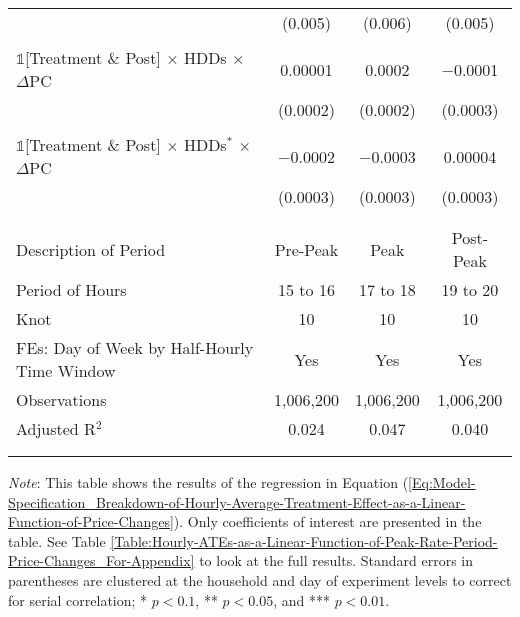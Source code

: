 {\begin{table}[t!]
\begin{adjustbox}{scale = 0.8}
\begin{threeparttable}
\begin{tabular}{@{\extracolsep{40pt}}lccc}
                    & (0.005) & (0.006) & (0.005) \\
                    & & & \\
                    $\mathbb{1}$[Treatment \& Post] $\times$ HDDs $\times$ $\Delta$PC & 0.00001 & 0.0002 & $-$0.0001 \\
                    & (0.0002) & (0.0002) & (0.0003) \\
                    & & & \\
                    $\mathbb{1}$[Treatment \& Post] $\times$ HDDs$^{*}$ $\times$ $\Delta$PC & $-$0.0002 & $-$0.0003 & 0.00004 \\
                    & (0.0003) & (0.0003) & (0.0003) \\
                    & & & \\
                    \hline
                    \\[-2.0ex]
                    Description of Period & Pre-Peak & Peak & Post-Peak \\
                    Period of Hours & 15 to 16 & 17 to 18 & 19 to 20 \\
                    Knot & 10 & 10 & 10 \\
                    FEs: Day of Week by Half-Hourly Time Window & Yes & Yes & Yes \\
                    Observations & 1,006,200 & 1,006,200 & 1,006,200 \\
                    Adjusted R$^{2}$ & 0.024 & 0.047 & 0.040 \\
                    \\[-2.0ex]
                    \hline \hline
                    \\[-4.5ex]
                \end{tabular}
                \begin{tablenotes}[flushleft]
                    \footnotesize
                    \item \textit{Note}: This table shows the results of the regression in Equation (\ref{Eq:Model-Specification_Breakdown-of-Hourly-Average-Treatment-Effect-as-a-Linear-Function-of-Price-Changes}). Only coefficients of interest are presented in the table. See Table \ref{Table:Hourly-ATEs-as-a-Linear-Function-of-Peak-Rate-Period-Price-Changes_For-Appendix} to look at the full results. Standard errors in parentheses are clustered at the household and day of experiment levels to correct for serial correlation; * $p < 0.1$, ** $p < 0.05$, and *** $p < 0.01$.
                \end{tablenotes}
            \end{threeparttable}
        \end{adjustbox}
    \end{table}
}
